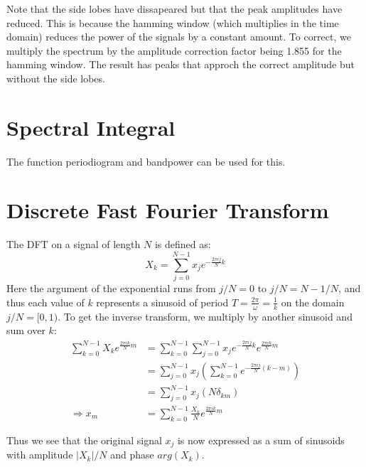\documentclass{article}
\begin{document}
Note that the side lobes have dissapeared but that the peak amplitudes
have reduced. This is because the hamming window (which multiplies in
the time domain) reduces the power of the signals by a constant
amount. To correct, we multiply the spectrum by the amplitude
correction factor being 1.855 for the hamming window. The result has
peaks that approch the correct amplitude but without the side lobes.

\section{Spectral Integral}
The function periodiogram and bandpower can be used for this.

\section{Discrete Fast Fourier Transform}
The DFT on a signal of length $N$ is defined as:
\begin{equation} X_k = \sum_{j=0}^{N-1} x_j e^{-\frac{2\pi i j }{N}k} \end{equation}
Here the argument of the exponential runs from $j/N=0$ to $j/N=N-1/N$,
and thus each value of $k$ represents a sinusoid of period
$T=\frac{2\pi}{\omega} = \frac{1}{k}$ on the domain $j/N=[0,1)$. To
get the inverse transform, we multiply by another sinusoid and sum
over $k$:
\begin{align} \sum_{k=0}^{N-1} X_k e^{\frac{2\pi i k}{N}m} &=
  \sum_{k=0}^{N-1}\sum_{j=0}^{N-1} x_j e^{-\frac{2\pi i j
    }{N}k}e^{\frac{2\pi i k}{N}m}
\\ &= \sum_{j=0}^{N-1} x_j \left(\sum_{k=0}^{N-1}e^{-\frac{2\pi i j
    }{N}(k-m)}\right) \\
&= \sum_{j=0}^{N-1} x_j \left(N\delta_{km}\right)\\
\Longrightarrow x_m &= \sum_{k=0}^{N-1} \frac{X_k}{N} e^{\frac{2\pi i
    k}{N}m}
\end{align}

Thus we see that the original signal $x_j$ is now expressed as a sum
of sinusoids with amplitude $|X_k|/N$ and phase $arg(X_k)$.
\end{document}

